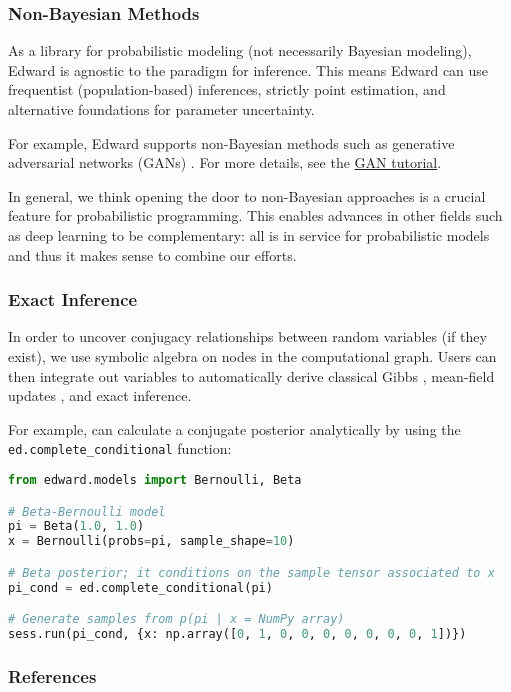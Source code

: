 \subsubsection{Non-Bayesian Methods}

As a library for probabilistic modeling (not necessarily Bayesian
modeling), Edward is agnostic to the paradigm for inference.  This
means Edward can use frequentist (population-based) inferences,
strictly point estimation, and alternative foundations for parameter
uncertainty.

For example, Edward supports non-Bayesian methods such as generative
adversarial networks (GANs)
\citep{goodfellow2014generative}.
For more details, see the \href{/tutorials/gan}{GAN tutorial}.

In general, we think opening the door to non-Bayesian approaches is a
crucial feature for probabilistic programming. This enables advances
in other fields such as deep learning to be complementary: all is in
service for probabilistic models and thus it makes sense to combine
our efforts.

\subsubsection{Exact Inference}

In order to uncover conjugacy relationships between random variables
(if they exist), we use symbolic algebra on nodes in the computational
graph.  Users can then integrate out variables to automatically derive
classical Gibbs \citep{gelfand1990sampling},
mean-field updates \citep{bishop2006pattern}, and exact inference.

For example,  can calculate a conjugate posterior analytically by
using the \texttt{ed.complete\_conditional} function:

\begin{lstlisting}[language=Python]
from edward.models import Bernoulli, Beta

# Beta-Bernoulli model
pi = Beta(1.0, 1.0)
x = Bernoulli(probs=pi, sample_shape=10)

# Beta posterior; it conditions on the sample tensor associated to x
pi_cond = ed.complete_conditional(pi)

# Generate samples from p(pi | x = NumPy array)
sess.run(pi_cond, {x: np.array([0, 1, 0, 0, 0, 0, 0, 0, 0, 1])})
\end{lstlisting}

\subsubsection{References}\label{references}
